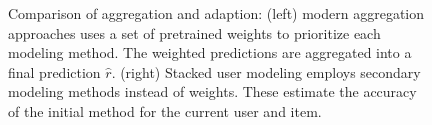 \begin{figure}[t]
\begin{minipage}{0.49\textwidth}
  \end{minipage} 
  \vspace{2em}
  \caption[Comparison of Aggregation and Adaption]{
    Comparison of aggregation and adaption:
    (left) modern aggregation approaches uses a set of pretrained weights
    to prioritize each modeling method.
    The weighted predictions are aggregated into a final prediction $\hat{r}$.
    (right) Stacked user modeling employs secondary modeling methods instead
    of weights. These estimate the accuracy of the initial method
    for the current user and item.
  }
  \label{fig:stack:comparison}
\end{figure}



